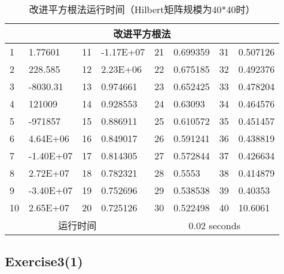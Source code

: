 \documentclass{article}
\begin{document}
\begin{table}[H]
	\centering
	\begin{tabular}{llllllll}
		\toprule
		\multicolumn{8}{c}{\textbf{改进平方根法}}                             \\
		\midrule
		1  & 1.77601   & 11 & -1.17E+07 & 21 & 0.699359 & 31 & 0.507126 \\
		2  & 228.585   & 12 & 2.23E+06  & 22 & 0.675185 & 32 & 0.492376 \\
		3  & -8030.31  & 13 & 0.974661  & 23 & 0.652425 & 33 & 0.478204 \\
		4  & 121009    & 14 & 0.928553  & 24 & 0.63093  & 34 & 0.464576 \\
		5  & -971857   & 15 & 0.886911  & 25 & 0.610572 & 35 & 0.451457 \\
		6  & 4.64E+06  & 16 & 0.849017  & 26 & 0.591241 & 36 & 0.438819 \\
		7  & -1.40E+07 & 17 & 0.814305  & 27 & 0.572844 & 37 & 0.426634 \\
		8  & 2.72E+07  & 18 & 0.782321  & 28 & 0.5553   & 38 & 0.414879 \\
		9  & -3.40E+07 & 19 & 0.752696  & 29 & 0.538538 & 39 & 0.40353  \\
		10 & 2.65E+07  & 20 & 0.725126  & 30 & 0.522498 & 40 & 10.6061 \\
		\multicolumn{4}{c}{运行时间} & \multicolumn{4}{c}{0.02 seconds} \\
		\bottomrule
	\end{tabular}
	\caption{改进平方根法运行时间（Hilbert矩阵规模为40*40时）}
\end{table}

\subsection*{Exercise3(1)}
\end{document}
